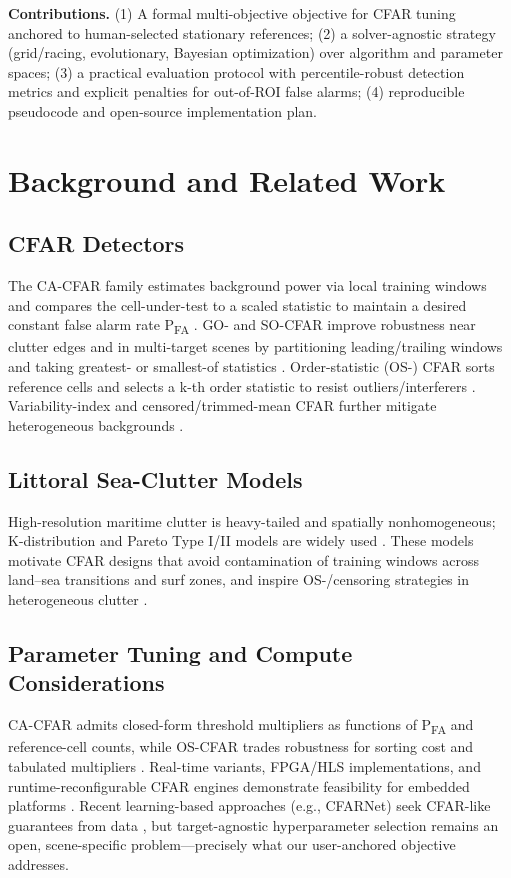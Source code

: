 \documentclass[conf]{new-aiaa}
\begin{document}
\textbf{Contributions.} (1) A formal multi-objective objective for CFAR tuning anchored to human-selected stationary references; (2) a solver-agnostic strategy (grid/racing, evolutionary, Bayesian optimization) over algorithm and parameter spaces; (3) a practical evaluation protocol with percentile-robust detection metrics and explicit penalties for out-of-ROI false alarms; (4) reproducible pseudocode and open-source implementation plan.

\section{Background and Related Work}
\subsection{CFAR Detectors}
The CA-CFAR family estimates background power via local training windows and compares the cell-under-test to a scaled statistic to maintain a desired constant false alarm rate P\textsubscript{FA} \cite{finn1968, gandhi1988, mathworksCFAR}. GO- and SO-CFAR improve robustness near clutter edges and in multi-target scenes by partitioning leading/trailing windows and taking greatest- or smallest-of statistics \cite{hansen1972, trunk1978}. Order-statistic (OS-) CFAR sorts reference cells and selects a k-th order statistic to resist outliers/interferers \cite{rohling1983, rimbert2005}. Variability-index and censored/trimmed-mean CFAR further mitigate heterogeneous backgrounds \cite{himonas1992, farina2005review}.

\subsection{Littoral Sea-Clutter Models}
High-resolution maritime clutter is heavy-tailed and spatially nonhomogeneous; K-distribution and Pareto Type I/II models are widely used \cite{jakeman1976, ward2006, weinberg2013}. These models motivate CFAR designs that avoid contamination of training windows across land--sea transitions and surf zones, and inspire OS-/censoring strategies in heterogeneous clutter \cite{cranfieldKCFAR, weinberg2019}.

\subsection{Parameter Tuning and Compute Considerations}
CA-CFAR admits closed-form threshold multipliers as functions of P\textsubscript{FA} and reference-cell counts, while OS-CFAR trades robustness for sorting cost and tabulated multipliers \cite{katzlberger2018}. Real-time variants, FPGA/HLS implementations, and runtime-reconfigurable CFAR engines demonstrate feasibility for embedded platforms \cite{rostov2025, zenodoRTOSCFAR}. Recent learning-based approaches (e.g., CFARNet) seek CFAR-like guarantees from data \cite{cfarnet2022}, but target-agnostic hyperparameter selection remains an open, scene-specific problem---precisely what our user-anchored objective addresses.
\end{document}
